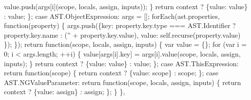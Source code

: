 \begin{DoxyCodeInclude}
{{{          value.push(args[i](scope, locals, assign, inputs));
        \}
        \textcolor{keywordflow}{return} context ? \{value: value\} : value;
      \};
    \textcolor{keywordflow}{case} AST.ObjectExpression:
      args = [];
      forEach(ast.properties, \textcolor{keyword}{function}(property) \{
        args.push(\{key: property.key.type === AST.Identifier ?
                        property.key.name :
                        (\textcolor{stringliteral}{''} + property.key.value),
                   value: self.recurse(property.value)
        \});
      \});
      \textcolor{keywordflow}{return} \textcolor{keyword}{function}(scope, locals, assign, inputs) \{
        var value = \{\};
        \textcolor{keywordflow}{for} (var i = 0; i < args.length; ++i) \{
          value[args[i].key] = args[i].value(scope, locals, assign, inputs);
        \}
        \textcolor{keywordflow}{return} context ? \{value: value\} : value;
      \};
    \textcolor{keywordflow}{case} AST.ThisExpression:
      \textcolor{keywordflow}{return} \textcolor{keyword}{function}(scope) \{
        \textcolor{keywordflow}{return} context ? \{value: scope\} : scope;
      \};
    \textcolor{keywordflow}{case} AST.NGValueParameter:
      \textcolor{keywordflow}{return} \textcolor{keyword}{function}(scope, locals, assign, inputs) \{
        \textcolor{keywordflow}{return} context ? \{value: assign\} : assign;
      \};
    \}
  \},

}}}
\end{DoxyCodeInclude}
